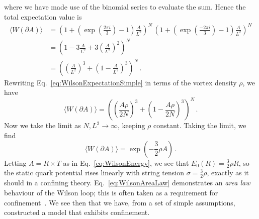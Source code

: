 %
where we have made use of the binomial series to evaluate the sum. Hence the total expectation value is
%
\begin{align}
\langle W(\partial A)\rangle &=\left(1+\left(\exp\left(\frac{2\pi i}{3}\right) - 1\right)\frac{A}{L^2}\right)^N\, \left(1+\left(\exp\left(\frac{-2\pi i}{3}\right) - 1\right)\frac{A}{L^2}\right)^N\nonumber\\
&=\left(1 -3\frac{A}{L^2} + 3\left(\frac{A}{L^2}\right)^2\right)^N\nonumber\\
&= \left(\left(\frac{A}{L^2}\right)^3+\left(1-\frac{A}{L^2}\right)^3\right)^N\, .\label{eq:WilsonExpectationSimple}
\end{align}
%
Rewriting Eq.~\eqref{eq:WilsonExpectationSimple} in terms of the vortex density $\rho$, we have
%
\begin{equation}
\langle W(\partial A)\rangle = \left(\left(\frac{A\rho}{2N}\right)^3+\left(1-\frac{A\rho}{2N}\right)^3\right)^N\, .
\end{equation}
%
Now we take the limit as $N,L^2\rightarrow\infty$, keeping $\rho$ constant. Taking the limit, we find
%
\begin{equation}
\langle W(\partial A)\rangle = \exp\left(-\frac{3}{2}\rho A\right)\, .
\label{eq:WilsonAreaLaw}
\end{equation}
%
Letting $A=R\times T$ as in Eq.~\eqref{eq:WilsonEnergy}, we see that $E_0(R) = \frac{3}{2}\rho R$, so the static quark potential rises linearly with string tension $\sigma = \frac{3}{2}\rho$, exactly as it should in a confining theory. Eq.~\eqref{eq:WilsonAreaLaw} demonstrates an {\it area law} behaviour of the Wilson loop; this is often taken as a requirement for confinement~\cite{DelDebbio:1998luz,Dosch:1988ha}. We see then that we have, from a set of simple assumptions, constructed a model that exhibits confinement.\\

